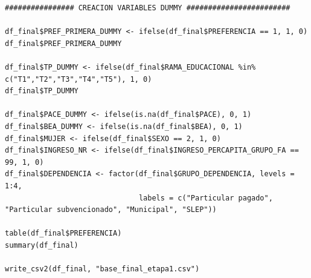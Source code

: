 \documentclass[11pt,letterpaper]{article}
\begin{document}
\begin{lstlisting}
################ CREACION VARIABLES DUMMY ########################

df_final$PREF_PRIMERA_DUMMY <- ifelse(df_final$PREFERENCIA == 1, 1, 0)
df_final$PREF_PRIMERA_DUMMY

df_final$TP_DUMMY <- ifelse(df_final$RAMA_EDUCACIONAL %in% c("T1","T2","T3","T4","T5"), 1, 0)
df_final$TP_DUMMY

df_final$PACE_DUMMY <- ifelse(is.na(df_final$PACE), 0, 1)
df_final$BEA_DUMMY <- ifelse(is.na(df_final$BEA), 0, 1)
df_final$MUJER <- ifelse(df_final$SEXO == 2, 1, 0)
df_final$INGRESO_NR <- ifelse(df_final$INGRESO_PERCAPITA_GRUPO_FA == 99, 1, 0)
df_final$DEPENDENCIA <- factor(df_final$GRUPO_DEPENDENCIA, levels = 1:4,
                               labels = c("Particular pagado", "Particular subvencionado", "Municipal", "SLEP"))

table(df_final$PREFERENCIA)
summary(df_final)

write_csv2(df_final, "base_final_etapa1.csv")
\end{lstlisting}
\end{document}
